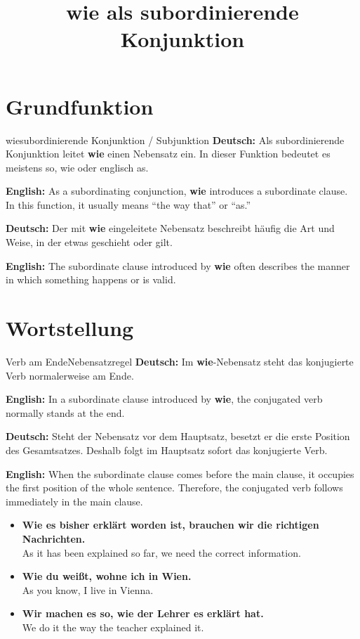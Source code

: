 \documentclass[a4paper,11pt]{article}
\title{\glqq wie\grqq{} als subordinierende Konjunktion}
\date{}
\newcommand{\GermanText}[1]{\textbf{Deutsch: }#1\par}
\newcommand{\EnglishText}[1]{{\small\color{SoftGray}\textbf{English: }#1\par}}
\newcommand{\ExampleItem}[2]{\item \textbf{#1}\\{\small\color{SoftGray}#2}}
\begin{document}
\maketitle
\tableofcontents
\newpage

\section{Grundfunktion}

\begin{grammarentry}{wie}{subordinierende Konjunktion / Subjunktion}
\GermanText{Als subordinierende Konjunktion leitet \textbf{wie} einen Nebensatz ein. In dieser Funktion bedeutet es meistens \glqq so, wie\grqq{} oder englisch \glqq as\grqq.}
\EnglishText{As a subordinating conjunction, \textbf{wie} introduces a subordinate clause. In this function, it usually means ``the way that'' or ``as.''}

\GermanText{Der mit \textbf{wie} eingeleitete Nebensatz beschreibt häufig die Art und Weise, in der etwas geschieht oder gilt.}
\EnglishText{The subordinate clause introduced by \textbf{wie} often describes the manner in which something happens or is valid.}
\end{grammarentry}

\section{Wortstellung}

\begin{grammarentry}{Verb am Ende}{Nebensatzregel}
\GermanText{Im \textbf{wie}-Nebensatz steht das konjugierte Verb normalerweise am Ende.}
\EnglishText{In a subordinate clause introduced by \textbf{wie}, the conjugated verb normally stands at the end.}

\GermanText{Steht der Nebensatz vor dem Hauptsatz, besetzt er die erste Position des Gesamtsatzes. Deshalb folgt im Hauptsatz sofort das konjugierte Verb.}
\EnglishText{When the subordinate clause comes before the main clause, it occupies the first position of the whole sentence. Therefore, the conjugated verb follows immediately in the main clause.}
\end{grammarentry}

\begin{exbox}
\begin{itemize}
\ExampleItem{Wie es bisher erklärt worden ist, brauchen wir die richtigen Nachrichten.}{As it has been explained so far, we need the correct information.}
\ExampleItem{Wie du weißt, wohne ich in Wien.}{As you know, I live in Vienna.}
\ExampleItem{Wir machen es so, wie der Lehrer es erklärt hat.}{We do it the way the teacher explained it.}
\end{itemize}
\end{exbox}
\end{document}
